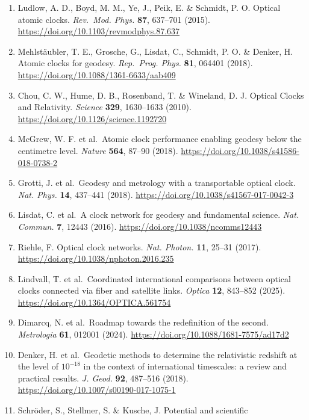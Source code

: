\documentclass[
  10pt,
  a4paper,
]{article}
\providecommand{\tightlist}{%
  \setlength{\itemsep}{0pt}\setlength{\parskip}{0pt}}
\begin{document}
\begin{enumerate}
\def\labelenumi{\arabic{enumi}.}
\tightlist
\item
  Ludlow, A. D., Boyd, M. M., Ye, J., Peik, E. \& Schmidt, P. O. Optical
  atomic clocks. \emph{Rev.~Mod. Phys.} \textbf{87}, 637--701 (2015).
  \url{https://doi.org/10.1103/revmodphys.87.637}
\item
  Mehlstäubler, T. E., Grosche, G., Lisdat, C., Schmidt, P. O. \&
  Denker, H. Atomic clocks for geodesy. \emph{Rep.~Prog. Phys.}
  \textbf{81}, 064401 (2018).
  \url{https://doi.org/10.1088/1361-6633/aab409}
\item
  Chou, C. W., Hume, D. B., Rosenband, T. \& Wineland, D. J. Optical
  Clocks and Relativity. \emph{Science} \textbf{329}, 1630--1633 (2010).
  \url{https://doi.org/10.1126/science.1192720}
\item
  McGrew, W. F. et al.~Atomic clock performance enabling geodesy below
  the centimetre level. \emph{Nature} \textbf{564}, 87--90 (2018).
  \url{https://doi.org/10.1038/s41586-018-0738-2}
\item
  Grotti, J. et al.~Geodesy and metrology with a transportable optical
  clock. \emph{Nat. Phys.} \textbf{14}, 437--441 (2018).
  \url{https://doi.org/10.1038/s41567-017-0042-3}
\item
  Lisdat, C. et al.~A clock network for geodesy and fundamental science.
  \emph{Nat. Commun.} \textbf{7}, 12443 (2016).
  \url{https://doi.org/10.1038/ncomms12443}
\item
  Riehle, F. Optical clock networks. \emph{Nat. Photon.} \textbf{11},
  25--31 (2017). \url{https://doi.org/10.1038/nphoton.2016.235}
\item
  Lindvall, T. et al.~Coordinated international comparisons between
  optical clocks connected via fiber and satellite links. \emph{Optica}
  \textbf{12}, 843--852 (2025).
  \url{https://doi.org/10.1364/OPTICA.561754}
\item
  Dimarcq, N. et al.~Roadmap towards the redefinition of the second.
  \emph{Metrologia} \textbf{61}, 012001 (2024).
  \url{https://doi.org/10.1088/1681-7575/ad17d2}
\item
  Denker, H. et al.~Geodetic methods to determine the relativistic
  redshift at the level of \(10^{-18}\) in the context of international
  timescales: a review and practical results. \emph{J. Geod.}
  \textbf{92}, 487--516 (2018).
  \url{https://doi.org/10.1007/s00190-017-1075-1}
\item
  Schröder, S., Stellmer, S. \& Kusche, J. Potential and scientific

\end{enumerate}
\end{document}
